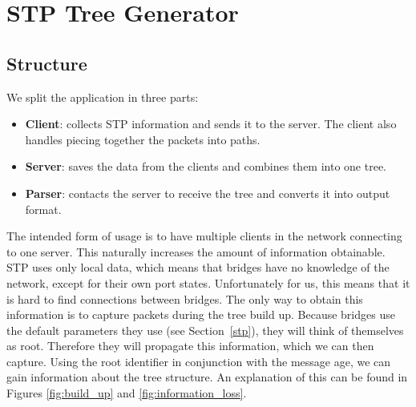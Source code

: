 \chapter{STP Tree Generator}
\label{stp_gen}
\section{Structure}
We split the application in three parts:
\begin{itemize}
    \item \textbf{Client}: collects STP information and sends it to the server.
        The client also handles piecing together the packets into paths.
    \item \textbf{Server}: saves the data from the clients and combines them into one tree.
    \item \textbf{Parser}: contacts the server to receive the tree and converts it into output format.
\end{itemize}
The intended form of usage is to have multiple clients in the network connecting to one server.
This naturally increases the amount of information obtainable.
STP uses only local data, which means that bridges have no knowledge of the network, except for their own port states.
Unfortunately for us, this means that it is hard to find connections between bridges.
The only way to obtain this information is to capture packets during the tree build up.
Because bridges use the default parameters they use (see Section~\ref{stp}), they will think of themselves as root.
Therefore they will propagate this information, which we can then capture.
Using the root identifier in conjunction with the message age, we can gain information about the tree structure.
An explanation of this can be found in Figures \ref{fig:build_up} and \ref{fig:information_loss}.
